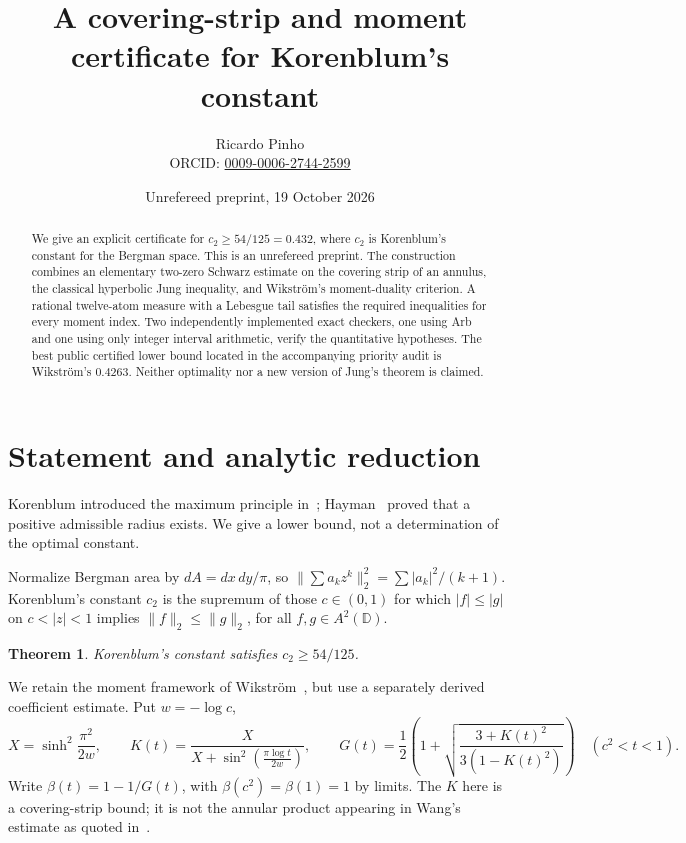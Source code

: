 \documentclass[11pt]{article}
\title{A covering-strip and moment certificate for Korenblum's constant}
\author{Ricardo Pinho\\\small ORCID: \href{https://orcid.org/0009-0006-2744-2599}{0009-0006-2744-2599}}
\date{Unrefereed preprint, 19 October 2026}
\newtheorem{theorem}{Theorem}
\newcommand{\D}{\mathbb D}
\begin{document}
\maketitle
\begin{abstract}
We give an explicit certificate for $c_2\ge54/125=0.432$, where $c_2$ is
Korenblum's constant for the Bergman space. This is an unrefereed preprint. The construction combines an
elementary two-zero Schwarz estimate on the covering strip of an annulus,
the classical hyperbolic Jung inequality, and Wikstr\"om's moment-duality
criterion. A rational twelve-atom measure with a Lebesgue tail satisfies the
required inequalities for every moment index. Two independently implemented
exact checkers, one using Arb and one using only integer interval arithmetic,
verify the quantitative hypotheses. The best public certified lower bound
located in the accompanying priority audit is Wikstr\"om's $0.4263$.
Neither optimality nor a new version of Jung's theorem is claimed.
\end{abstract}

\section{Statement and analytic reduction}
Korenblum introduced the maximum principle in~\cite{Korenblum};
Hayman~\cite{Hayman} proved that a positive admissible radius exists.
We give a lower bound, not a determination of the optimal constant.

Normalize Bergman area by $dA=dx\,dy/\pi$, so
$\|\sum a_kz^k\|_2^2=\sum |a_k|^2/(k+1)$. Korenblum's constant $c_2$ is
the supremum of those $c\in(0,1)$ for which $|f|\le|g|$ on
$c<|z|<1$ implies $\|f\|_2\le\|g\|_2$, for all $f,g\in A^2(\D)$.

\begin{theorem}\label{thm:main}
Korenblum's constant satisfies $c_2\ge54/125$.
\end{theorem}

We retain the moment framework of Wikstr\"om~\cite{Wikstrom}, but use a
separately derived coefficient estimate. Put $w=-\log c$,
\[
 X=\sinh^2\frac{\pi^2}{2w},\qquad
 K(t)=\frac{X}{X+\sin^2\!\left(\frac{\pi\log t}{2w}\right)},\qquad
 G(t)=\frac12\left(1+\sqrt{\frac{3+K(t)^2}{3(1-K(t)^2)}}\right)
 \quad(c^2<t<1).
\]
Write $\beta(t)=1-1/G(t)$, with $\beta(c^2)=\beta(1)=1$ by limits.
The $K$ here is a covering-strip bound; it is not the annular product
appearing in Wang's estimate as quoted in~\cite{Wikstrom}.
\end{document}

